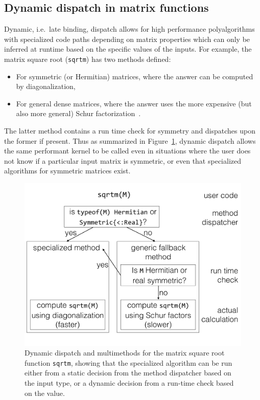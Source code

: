 \documentclass[10pt, preprint]{sigplanconf}
\begin{document}
\subsection{Dynamic dispatch in matrix functions}

Dynamic, i.e.\ late binding, dispatch allows for high performance
polyalgorithms with specialized code paths depending on matrix properties which
can only be inferred at runtime based on the specific values of the inputs. For
example, the matrix square root (\verb|sqrtm|) has two methods defined:

\begin{itemize}
	\item For symmetric (or Hermitian) matrices, where the answer can be
		computed by diagonalization,
	\item For general dense matrices, where the answer uses the more
		expensive (but also more general) Schur
		factorization~\cite{Higham2008}.
\end{itemize}
%
The latter method contains a run time check for symmetry and dispatches upon
the former if present. Thus as summarized in Figure~\ref{fig:sqrtm}, dynamic
dispatch allows the same performant kernel to be called even in situations
where the user does not know if a particular input matrix is symmetric, or even
that specialized algorithms for symmetric matrices exist.

\begin{figure}
	\centering
	\includegraphics[width=\columnwidth]{fig-sqrtm}
	\caption{Dynamic dispatch and multimethods for the matrix square root
		function \texttt{sqrtm}, showing that the specialized algorithm
		can be run either from a static decision from the method
		dispatcher based on the input type, or a dynamic decision from
		a run-time check based on the value.}
	\label{fig:sqrtm}
\end{figure}
\end{document}
